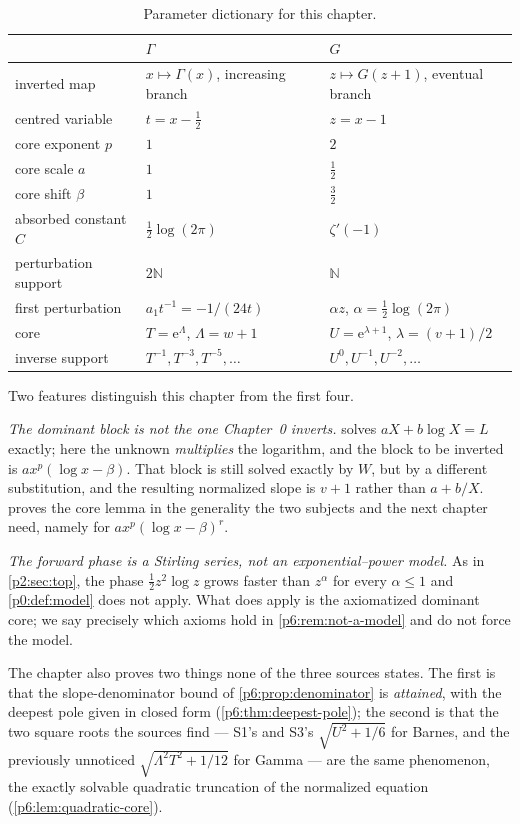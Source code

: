 \documentclass[11pt,a4paper,oneside]{book}
\theoremstyle{plain}
\theoremstyle{definition}
\theoremstyle{remark}
\newcommand{\Nat}{\mathbb{N}}
\newcommand{\e}{\mathrm{e}}
\newcommand{\Wlam}{W}
\begin{document}
\begin{table}[htbp]
\centering
\caption{Parameter dictionary for this chapter.}
\label{p6:tab:sources}
\small
\begin{tabular}{@{}lll@{}}
\toprule
 & $\Gamma$ & $G$\\
\midrule
inverted map & $x\mapsto\Gamma(x)$, increasing branch
             & $z\mapsto G(z+1)$, eventual branch\\
centred variable & $t=x-\tfrac12$ & $z=x-1$\\
core exponent $p$ & $1$ & $2$\\
core scale $a$ & $1$ & $\tfrac12$\\
core shift $\beta$ & $1$ & $\tfrac32$\\
absorbed constant $C$ & $\tfrac12\log(2\pi)$ & $\zeta'(-1)$\\
perturbation support & $2\Nat$ & $\Nat$\\
first perturbation & $a_1t^{-1}=-1/(24t)$ & $\alpha z$, $\alpha=\tfrac12\log(2\pi)$\\
core & $T=\e^{\Lambda}$, $\Lambda=w+1$ & $U=\e^{\lambda+1}$, $\lambda=(v+1)/2$\\
inverse support & $T^{-1},T^{-3},T^{-5},\dots$ & $U^{0},U^{-1},U^{-2},\dots$\\
\bottomrule
\end{tabular}
\end{table}

Two features distinguish this chapter from the first four.

\emph{The dominant block is not the one Chapter~0 inverts.}
 solves $aX+b\log X=L$ exactly; here the unknown
\emph{multiplies} the logarithm, and the block to be inverted is
$a x^{p}(\log x-\beta)$.  That block is still solved exactly by
$\Wlam$, but by a different substitution, and the resulting normalized slope
is $v+1$ rather than $a+b/X$.   proves the core lemma in the
generality the two subjects and the next chapter need, namely for
$a x^{p}(\log x-\beta)^{r}$.

\emph{The forward phase is a Stirling series, not an
exponential--power model.}  As in \cref{p2:sec:top}, the phase
$\tfrac12z^{2}\log z$ grows faster than $z^{\alpha}$ for every
$\alpha\le1$ and \cref{p0:def:model} does not apply.  What does apply is the
axiomatized dominant core; we say precisely which axioms hold in
\cref{p6:rem:not-a-model} and do not force the model.

The chapter also proves two things none of the three sources states.  The
first is that the slope-denominator bound of \cref{p6:prop:denominator} is
\emph{attained}, with the deepest pole given in closed form
(\cref{p6:thm:deepest-pole}); the second is that the two square roots the
sources find --- S1's and S3's $\sqrt{U^{2}+1/6}$ for Barnes, and the
previously unnoticed $\sqrt{\Lambda^{2}T^{2}+1/12}$ for Gamma --- are the same
phenomenon, the exactly solvable quadratic truncation of the normalized
equation (\cref{p6:lem:quadratic-core}).
\end{document}
